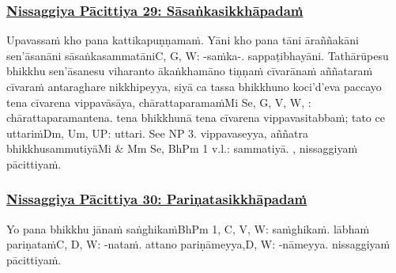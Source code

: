 \subsubsection*{\hyperref[forf-exp29]{Nissaggiya Pācittiya 29: Sāsaṅkasikkhāpadaṁ}}
\label{np29}

Upavassaṁ kho pana kattikapuṇṇamaṁ. Yāni kho pana tāni āraññakāni sen'āsanāni sāsaṅkasammatāni\makeatletter\hyperlink{endnote-appendix}\makeatother C, G, W: -saṁka-. sappaṭibhayāni. Tathārūpesu bhikkhu sen'āsanesu viharanto ākaṅkhamāno tiṇṇaṁ cīvarānaṁ aññataraṁ cīvaraṁ antaraghare nikkhipeyya, siyā ca tassa bhikkhuno koci'd'eva paccayo tena cīvarena vippavāsāya, chārattaparamaṁ\makeatletter\hyperlink{endnote-appendix}\makeatother Mi Se, G, V, W,  : chārattaparamantena. tena bhikkhunā tena cīvarena vippavasitabbaṁ; tato ce uttariṁ\makeatletter\hyperlink{endnote-appendix}\makeatother Dm, Um, UP: uttari. See NP 3. vippavaseyya, aññatra bhikkhusammutiyā\makeatletter\hyperlink{endnote-appendix}\makeatother Mi & Mm Se, BhPm 1 v.l.: sammatiyā. , nissaggiyaṁ pācittiyaṁ.



\subsubsection*{\hyperref[forf-exp30]{Nissaggiya Pācittiya 30: Pariṇatasikkhāpadaṁ}}
\label{np30}

Yo pana bhikkhu jānaṁ saṅghikaṁ\makeatletter\hyperlink{endnote-appendix}\makeatother BhPm 1, C, V, W: saṁghikaṁ. lābhaṁ pariṇataṁ\makeatletter\hyperlink{endnote-appendix}\makeatother C, D, W: -nataṁ.  attano pariṇāmeyya,\makeatletter\hyperlink{endnote-appendix}\makeatother D, W: -nāmeyya. nissaggiyaṁ pācittiyaṁ.

